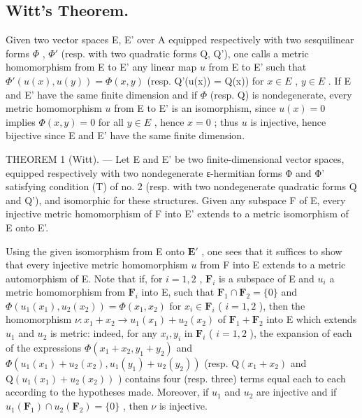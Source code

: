 \subsection{Witt's Theorem.}

Given two vector spaces E, E' over A equipped respectively with two sesquilinear forms \(\Phi\) , \(\Phi'\) (resp. with two quadratic forms Q, Q'), one calls a metric homomorphism from E to E' any linear map \(u\) from E to E' such that \(\Phi'(u(x), u(y)) = \Phi(x, y)\) (resp. Q'(u(x)) = Q(x)) for \(x \in E\) , \(y \in E\) . If E and E' have the same finite dimension and if \(\Phi\) (resp. Q) is nondegenerate, every metric homomorphism \(u\) from E to E' is an isomorphism, since \(u(x) = 0\) implies \(\Phi(x, y) = 0\) for all \(y \in E\) , hence \(x = 0\) ; thus \(u\) is injective, hence bijective since E and E' have the same finite dimension.

THEOREM 1 (Witt). — Let E and E' be two finite-dimensional vector spaces, equipped respectively with two nondegenerate ε-hermitian forms Φ and Φ' satisfying condition (T) of no. 2 (resp. with two nondegenerate quadratic forms Q and Q'), and isomorphic for these structures. Given any subspace F of E, every injective metric homomorphism of F into E' extends to a metric isomorphism of E onto E'.

Using the given isomorphism from E onto \(\mathbf{E}'\) , one sees that it suffices to show that every injective metric homomorphism \(u\) from F into E extends to a metric automorphism of E. Note that if, for \(i = 1, 2\) , \(\mathbf{F}_i\) is a subspace of E and \(u_i\) a metric homomorphism from \(\mathbf{F}_i\) into E, such that \(\mathbf{F}_1 \cap \mathbf{F}_2 = \{0\}\) and \(\Phi(u_1(x_1), u_2(x_2)) = \Phi(x_1, x_2)\) for \(x_i \in \mathbf{F}_i\) ( \(i = 1, 2\) ), then the homomorphism \(\nu : x_1 + x_2 \to u_1(x_1) + u_2(x_2)\) of \(\mathbf{F}_1 + \mathbf{F}_2\) into E which extends \(u_1\) and \(u_2\) is metric: indeed, for any \(x_i, y_i\) in \(\mathbf{F}_i\) ( \(i = 1, 2\) ), the expansion of each of the expressions \(\Phi(x_1 + x_2, y_1 + y_2)\) and \(\Phi(u_1(x_1) + u_2(x_2), u_1(y_1) + u_2(y_2))\) (resp. \(\mathrm{Q}(x_1 + x_2)\) and \(\mathrm{Q}(u_1(x_1) + u_2(x_2))\) ) contains four (resp. three) terms equal each to each according to the hypotheses made. Moreover, if \(u_1\) and \(u_2\) are injective and if \(u_1(\mathbf{F}_1) \cap u_2(\mathbf{F}_2) = \{0\}\) , then \(\nu\) is injective.

